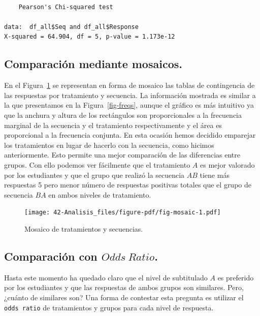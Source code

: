 \documentclass[
  12pt,
  a4paper,
  extrafontsizes,
  onecolumn,
  openright]{memoir}
\begin{document}
\begin{verbatim}

    Pearson's Chi-squared test

data:  df_all$Seq and df_all$Response
X-squared = 64.904, df = 5, p-value = 1.173e-12
\end{verbatim}

\normalsize

\hypertarget{comparaciuxf3n-mediante-mosaicos.}{%
\subsection{Comparación mediante
mosaicos.}\label{comparaciuxf3n-mediante-mosaicos.}}

En el Figura~\ref{fig-mosaic} se representan en forma de mosaico las
tablas de contingencia de las respuestas por tratamiento y secuencia. La
información mostrada es similar a la que presentamos en la
Figura~\ref{fig-freqs}, aunque el gráfico es más intuitivo ya que la
anchura y altura de los rectángulos son proporcionales a la frecuencia
marginal de la secuencia y el tratamiento respectivamente y el área es
proporcional a la frecuencia conjunta. En esta ocasión hemos decidido
emparejar los tratamientos en lugar de hacerlo con la secuencia, como
hicimos anteriormente. Esto permite una mejor comparación de las
diferencias entre grupos. Con ello podemos ver fácilmente que el
tratamiento \(A\) es mejor valorado por los estudiantes y que el grupo
que realizó la secuencia \(AB\) tiene más respuestas 5 pero menor número
de respuestas positivas totales que el grupo de secuencia \(BA\) en
ambos niveles de tratamiento.

\begin{figure}[h]

{\centering \texttt{[image: 42-Analisis\_files/figure-pdf/fig-mosaic-1.pdf]}

}

\caption{\label{fig-mosaic}Mosaico de tratamientos y secuencias.}

\end{figure}

\hypertarget{sec-or}{%
\subsection{\texorpdfstring{Comparación con
\(Odds\ Ratio\).}{Comparación con Odds\textbackslash{} Ratio.}}\label{sec-or}}

Hasta este momento ha quedado claro que el nivel de subtitulado \(A\) es
preferido por los estudiantes y que las respuestas de ambos grupos son
similares. Pero, ¿cuánto de similares son? Una forma de contestar esta
pregunta es utilizar el \texttt{odds\ ratio} de tratamientos y grupos
para cada nivel de respuesta.
\end{document}
